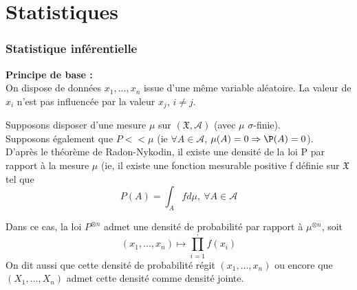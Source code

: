 \part{Statistiques}
\section{Statistique inférentielle}

\textbf{Principe de base :} \\
On dispose de données $x_1,...,x_n$ issue d'une même variable aléatoire. La valeur de $x_i$ n'est pas influencée par la valeur $x_j$, $i\neq j$. 



Supposons disposer d'une mesure $\mu$ sur $(\mathfrak{X},\mathcal{A})$ (avec $\mu$ $\sigma$-finie).\\
Supposons également que $P<<\mu$ (ie $\forall A\in\mathcal{A}$, $\mu(A)=0 \Rightarrow \P(A)=0$). \\
D'après le théorème de Radon-Nykodin, il existe une densité de la loi P par rapport à la mesure $\mu$ (ie, il existe une fonction mesurable positive f définie sur $\mathfrak{X}$ tel que 
\[P(A)=\int_A f d\mu,\ \forall A\in\mathcal{A}\]

Dans ce cas, la loi $P^{\otimes n}$ admet une densité de probabilité par rapport à $\mu^{\otimes n}$, soit \[(x_1,...,x_n) \mapsto \prod_{i=1}^, f(x_i)\]
On dit aussi que cette densité de probabilité régit $(x_1,...,x_n)$ ou encore que $(X_1,...,X_n)$ admet cette densité comme densité jointe.

